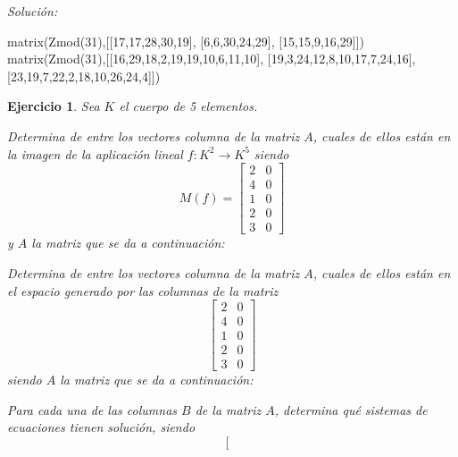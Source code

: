 \documentclass[12pt]{amsart}
\newtheorem{ejer}{Ejercicio}
\begin{document}
{\it Soluci\'on:}

\begin{sageblock}
matrix(Zmod(31),[[17,17,28,30,19],
[6,6,30,24,29],
[15,15,9,16,29]])
matrix(Zmod(31),[[16,29,18,2,19,19,10,6,11,10],
[19,3,24,12,8,10,17,7,24,16],
[23,19,7,22,2,18,10,26,24,4]])
\end{sageblock}



\begin{ejer} Sea $K$ el cuerpo de 5 elementos.
\newline
\noindent\begin{minipage}{\textwidth}
\begin{tcolorbox}[colback = green!20!white,title=Versión Núcleo]
Determina de entre los vectores columna de la matriz $A$, cuales de ellos están en la imagen de la aplicación lineal $f:K^{2} \to K^{5}$ siendo  $$ M(f) = \left[\begin{array}{rr}
2 & 0 \\
4 & 0 \\
1 & 0 \\
2 & 0 \\
3 & 0
\end{array}\right] $$ y $A$ la matriz que se da a continuación:\end{tcolorbox}
\end{minipage} \newline
\noindent\begin{minipage}{\textwidth}
\begin{tcolorbox}[colback = blue!20!white,title=Versión Anulador]
Determina de entre los vectores columna de la matriz $A$, cuales de ellos están en el espacio generado por las columnas de la matriz $$ \left[\begin{array}{rr}
2 & 0 \\
4 & 0 \\
1 & 0 \\
2 & 0 \\
3 & 0
\end{array}\right] $$ siendo $A$ la matriz que se da a continuación:\end{tcolorbox}
\end{minipage} \newline
\noindent\begin{minipage}{\textwidth} 
\begin{tcolorbox}[colback = red!20!white,title=Versión Ecuaciones Implícitas]
Para cada una de las columnas $B$ de la matriz $A$, determina qué sistemas de ecuaciones tienen solución, siendo $$ \left[\begin{array}{rr}

\end{array}$$
\end{tcolorbox}
\end{minipage}
\end{ejer}
\end{document}
